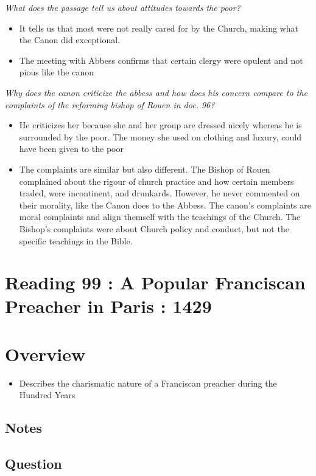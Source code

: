 \documentclass[12pt]{article}
\begin{document}
\textit{What does the passage tell us about attitudes towards the poor?}
\begin{itemize}
	\item It tells us that most were not really cared for by the Church, making what the Canon did exceptional.
	\item The meeting with Abbess confirms that certain clergy were opulent and not pious like the canon
\end{itemize}

\textit{Why does the canon criticize the abbess and how does his concern compare to the complaints of the reforming bishop of Rouen in doc. 96?}
\begin{itemize}
	\item He criticizes her because she and her group are dressed nicely whereas he is surrounded by the poor. The money she used on clothing and luxury, could have been given to the poor
	\item The complaints are similar but also different. The Bishop of Rouen complained about the rigour of church practice and how certain members traded, were incontinent, and drunkards. However, he never commented on their morality, like the Canon does to the Abbess. The canon's complaints are moral complaints and align themself with the teachings of the Church. The Bishop's complaints were about Church policy and conduct, but not the specific teachings in the Bible.
\end{itemize}

\section*{Reading 99 : A Popular Franciscan Preacher in Paris : 1429}

\section*{Overview}

\begin{itemize}
	\item Describes the charismatic nature of a Franciscan preacher during the Hundred Years
\end{itemize}

\subsection*{Notes}

\subsection*{Question}
\end{document}
